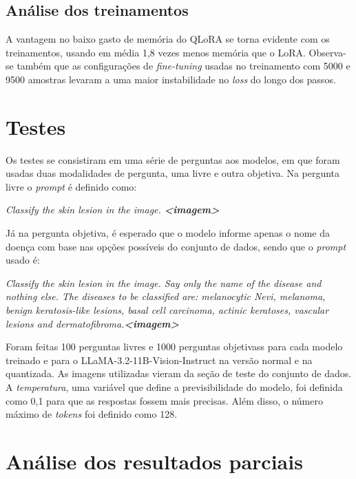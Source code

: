 \subsection{Análise dos treinamentos}

A vantagem no baixo gasto de memória do \ac{QLoRA} se torna evidente com os treinamentos, usando em média 1,8 vezes
menos memória que o \ac{LoRA}. Observa-se também que as configurações de \textit{fine-tuning} usadas no treinamento com
5000 e 9500 amostras levaram a uma maior instabilidade no \textit{loss} do longo dos passos.

\section{Testes}

Os testes se consistiram em uma série de perguntas aos modelos, em que foram usadas duas modalidades de pergunta, uma
livre e outra objetiva. Na pergunta livre o \textit{prompt} é definido como:

\begin{dialogue}
     \textit{Classify the skin lesion in the image. \textbf{<imagem>}}
\end{dialogue}

Já na pergunta objetiva, é esperado que o modelo informe apenas o nome da doença com base nas opções possíveis do
conjunto de dados, sendo que o \textit{prompt} usado é:

\begin{dialogue}
     \textit{Classify the skin lesion in the image. Say only the name of the disease and nothing else. The diseases to be classified are: melanocytic Nevi,
    melanoma, benign keratosis-like lesions, basal cell carcinoma, actinic keratoses, vascular lesions and dermatofibroma.\textbf{<imagem>}}
\end{dialogue}

Foram feitas 100 perguntas livres e 1000 perguntas objetivass para cada modelo treinado e para o
\ac{LLaMA}-3.2-11B-Vision-Instruct na versão normal e na quantizada. As imagens utilizadas vieram da seção de teste do
conjunto de dados. A \textit{temperatura}, uma variável que define a previsibilidade do modelo, foi definida como 0,1
para que as respostas fossem mais precisas. Além disso, o número máximo de \textit{tokens} foi definido como 128.

\section{Análise dos resultados parciais}


